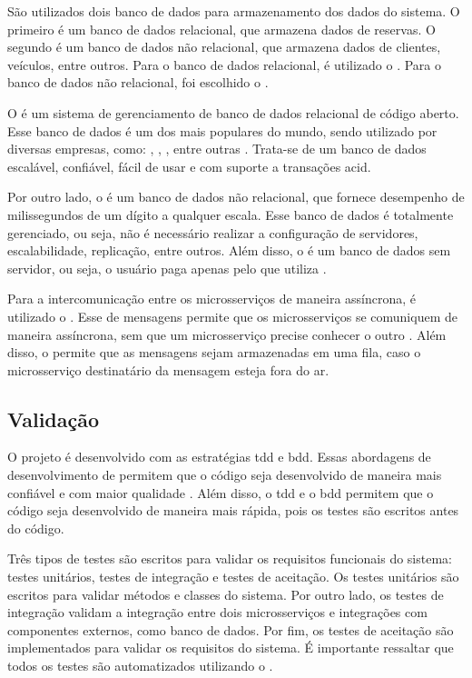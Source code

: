 São utilizados dois banco de dados para armazenamento dos dados do sistema. O primeiro é um banco de dados relacional, que armazena dados de reservas. O segundo é um banco de dados não relacional, que armazena dados de clientes, veículos, entre outros. Para o banco de dados relacional, é utilizado o . Para o banco de dados não relacional, foi escolhido o .

O  é um sistema de gerenciamento de banco de dados relacional de código aberto. Esse banco de dados é um dos mais populares do mundo, sendo utilizado por diversas empresas, como: , , , entre outras \cite{postgreSql}. Trata-se de um banco de dados escalável, confiável, fácil de usar e com suporte a transações \acrshort{acid}.

Por outro lado, o  é um banco de dados não relacional, que fornece desempenho de milissegundos de um dígito a qualquer escala. Esse banco de dados é totalmente gerenciado, ou seja, não é necessário realizar a configuração de servidores, escalabilidade, replicação, entre outros. Além disso, o  é um banco de dados sem servidor, ou seja, o usuário paga apenas pelo que utiliza \cite{dynamoDb}.

Para a intercomunicação entre os microsserviços de maneira assíncrona, é utilizado o . Esse  de mensagens permite que os microsserviços se comuniquem de maneira assíncrona, sem que um microsserviço precise conhecer o outro \cite{amazonSqs}. Além disso, o  permite que as mensagens sejam armazenadas em uma fila, caso o microsserviço destinatário da mensagem esteja fora do ar.

\subsection{Validação}
O projeto é desenvolvido com as estratégias \acrfull{tdd} e \acrfull{bdd}. Essas abordagens de desenvolvimento de  permitem que o código seja desenvolvido de maneira mais confiável e com maior qualidade \cite{barauna2020tdd}. Além disso, o \acrshort{tdd} e o \acrshort{bdd} permitem que o código seja desenvolvido de maneira mais rápida, pois os testes são escritos antes do código.

Três tipos de testes são escritos para validar os requisitos funcionais do sistema: testes unitários, testes de integração e testes de aceitação. Os testes unitários são escritos para validar métodos e classes do sistema. Por outro lado, os testes de integração validam a integração entre dois microsserviços e integrações com componentes externos, como banco de dados. Por fim, os testes de aceitação são implementados para validar os requisitos do sistema. É importante ressaltar que todos os testes são automatizados utilizando o .


